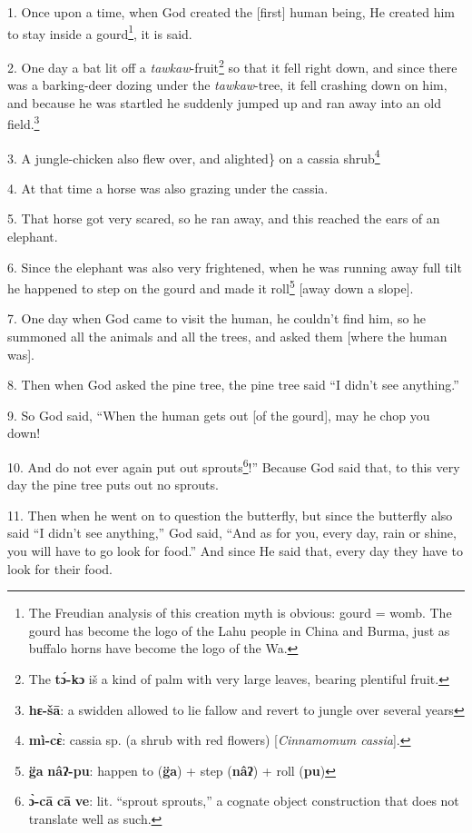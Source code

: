 \setcounter{footnote}{0}

1. Once upon a time, when God created the [first] human being, He created him to
stay inside a gourd\footnote{The Freudian analysis of this creation myth is obvious: gourd = womb. The gourd has become the logo of the Lahu people in China and Burma, just as buffalo horns have become the logo of the Wa.}, it is said.

2. One day a bat lit off a \textit{tawkaw}-fruit\footnote{The \textbf{tɔ́-kɔ} iš a kind of palm with very large leaves, bearing plentiful fruit.} so that it fell right down,
and since there was a barking-deer dozing under the \textit{tawkaw}-tree, it fell
crashing down on him, and because he was startled he suddenly jumped up and ran
away into an old field.\footnote{\textbf{hɛ-šā}: a swidden allowed to lie fallow and revert to jungle over several years}

3. A jungle-chicken also flew over, and alighted\} on a cassia shrub\footnote{\textbf{mì-cɛ̀}: cassia sp. (a shrub with red flowers) [\textit{Cinnamomum cassia}].}

4. At that time a horse was also grazing under the cassia.

5. That horse got very scared, so he ran away, and this reached the ears of an
elephant.

6. Since the elephant was also very frightened, when he was running away full tilt
he happened to step on the gourd and made it roll\footnote{\textbf{g̈a} \textbf{nâʔ-pu}: happen to (\textbf{g̈a}) + step (\textbf{nâʔ}) + roll (\textbf{pu})} [away down a slope].

7. One day when God came to visit the human, he couldn't find him, so he summoned
all the animals and all the trees, and asked them [where the human was].

8. Then when God asked the pine tree, the pine tree said ``I didn't see anything.''

9. So God said, ``When the human gets out [of the gourd], may he chop you down!

10. And do not ever again put out sprouts\footnote{\textbf{ɔ̀-cā} \textbf{cā} \textbf{ve}: lit. ``sprout sprouts,'' a cognate object construction that does not translate well as such.}!'' Because God said that, to this
very day the pine tree puts out no sprouts.

11. Then when he went on to question the butterfly, but since the butterfly also
said ``I didn't see anything,'' God said, ``And as for you, every day, rain or
shine, you will have to go look for food.'' And since He said that, every day they
have to look for their food.

